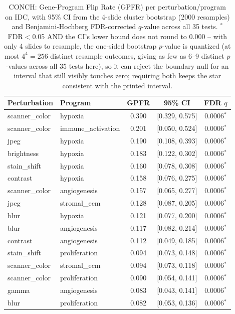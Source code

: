 \begin{table}[t]
\centering
\caption{CONCH: Gene-Program Flip Rate (GPFR) per perturbation/program on IDC, with 95\% CI from the 4-slide cluster bootstrap (2000 resamples) and Benjamini-Hochberg FDR-corrected $q$-value across all 35 tests. $^{*}$ FDR$<$0.05 AND the CI's lower bound does not round to 0.000 -- with only 4 slides to resample, the one-sided bootstrap $p$-value is quantized (at most $4^4=256$ distinct resample outcomes, giving as few as 6--9 distinct $p$-values across all 35 tests here), so it can reject the boundary null for an interval that still visibly touches zero; requiring both keeps the star consistent with the printed interval.}
\label{tab:gpfr_conch}
\begin{tabular}{llccc}
\toprule
Perturbation & Program & GPFR & 95\% CI & FDR $q$ \\
\midrule
scanner\_color & hypoxia & 0.390 & [0.329, 0.575] & 0.0006$^{*}$ \\
scanner\_color & immune\_activation & 0.201 & [0.050, 0.524] & 0.0006$^{*}$ \\
jpeg & hypoxia & 0.190 & [0.108, 0.393] & 0.0006$^{*}$ \\
brightness & hypoxia & 0.183 & [0.122, 0.302] & 0.0006$^{*}$ \\
stain\_shift & hypoxia & 0.160 & [0.078, 0.308] & 0.0006$^{*}$ \\
contrast & hypoxia & 0.158 & [0.076, 0.275] & 0.0006$^{*}$ \\
scanner\_color & angiogenesis & 0.157 & [0.065, 0.277] & 0.0006$^{*}$ \\
jpeg & stromal\_ecm & 0.128 & [0.087, 0.205] & 0.0006$^{*}$ \\
blur & hypoxia & 0.121 & [0.077, 0.200] & 0.0006$^{*}$ \\
blur & angiogenesis & 0.117 & [0.082, 0.214] & 0.0006$^{*}$ \\
contrast & angiogenesis & 0.112 & [0.049, 0.185] & 0.0006$^{*}$ \\
stain\_shift & proliferation & 0.094 & [0.073, 0.148] & 0.0006$^{*}$ \\
scanner\_color & stromal\_ecm & 0.094 & [0.073, 0.118] & 0.0006$^{*}$ \\
scanner\_color & proliferation & 0.090 & [0.054, 0.141] & 0.0006$^{*}$ \\
gamma & angiogenesis & 0.083 & [0.043, 0.141] & 0.0006$^{*}$ \\
blur & proliferation & 0.082 & [0.053, 0.136] & 0.0006$^{*}$ \\

\end{tabular}
\end{table}
